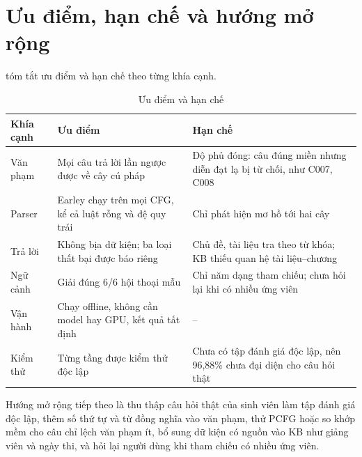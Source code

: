 \section{Ưu điểm, hạn chế và hướng mở rộng}
\label{sec:discussion}

 tóm tắt ưu điểm và hạn chế theo từng khía cạnh.

\begin{table}[H]
  \centering
  \small
  \begin{tabularx}{\linewidth}{|P{2.2cm}|L|L|}
    \hline
    \textbf{Khía cạnh} & \textbf{Ưu điểm} & \textbf{Hạn chế} \\ \hline
    Văn phạm & Mọi câu trả lời lần ngược được về cây cú pháp & Độ phủ đóng: câu đúng miền
      nhưng diễn đạt lạ bị từ chối, như C007, C008 \\ \hline
    Parser & Earley chạy trên mọi CFG, kể cả luật rỗng và đệ quy trái & Chỉ phát hiện mơ hồ
      tới hai cây \\ \hline
    Trả lời & Không bịa dữ kiện; ba loại thất bại được báo riêng & Chủ đề, tài liệu tra theo
      từ khóa; KB thiếu quan hệ tài liệu--chương \\ \hline
    Ngữ cảnh & Giải đúng 6/6 hội thoại mẫu & Chỉ năm dạng tham chiếu; chưa hỏi lại khi có
      nhiều ứng viên \\ \hline
    Vận hành & Chạy offline, không cần model hay GPU, kết quả tất định & -- \\ \hline
    Kiểm thử & Từng tầng được kiểm thử độc lập & Chưa có tập đánh giá độc lập, nên 96,88\%
      chưa đại diện cho câu hỏi thật \\ \hline
  \end{tabularx}
  \caption{Ưu điểm và hạn chế}
  \label{tab:proscons}
\end{table}

Hướng mở rộng tiếp theo là thu thập câu hỏi thật của sinh viên làm tập đánh giá độc lập,
thêm số thứ tự và từ đồng nghĩa vào văn phạm, thử PCFG hoặc so khớp mềm cho câu chỉ lệch văn
phạm ít, bổ sung dữ kiện có nguồn vào KB như giảng viên và ngày thi, và hỏi lại người dùng
khi tham chiếu có nhiều ứng viên.
